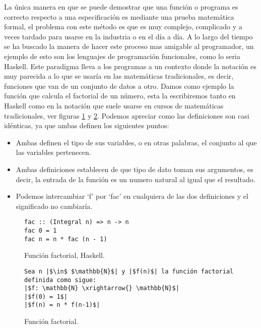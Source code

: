 La única manera en que se puede demostrar que una función o programa 
es correcto respecto a una especificación es mediante una prueba 
matemática formal, el problema con este método es que es muy complejo, 
complicado y a veces tardado para usarse en la industria o en el día a día. A lo largo del tiempo 
se ha buscado la manera de hacer este proceso mas amigable al programador, un ejemplo de esto son 
los lenguajes de programación funcionales, como lo seria Haskell. Este paradigma lleva a los 
programas a un contexto donde la notaci\'on es muy parecida a lo que se usar\'ia en las
matemáticas tradicionales, es decir, funciones que van de un conjunto de datos a otro. Damos como 
ejemplo la funci\'on que calcula el factorial de un n\'umero, esta la escribiremos tanto en Haskell 
como en la notaci\'on que suele usarse en cursos de matemáticas tradicionales, ver figuras 
\ref{func_fact_hask} y \ref{func_fact_math}. 
Podemos apreciar como las definiciones son casi idénticas, ya que ambas definen los siguientes 
puntos:
\begin{itemize}
    \item Ambas definen el tipo de sus variables, o en otras palabras, el conjunto al que las 
    variables pertenecen.
    \item Ambas definiciones establecen de que tipo de dato toman sus argumentos, es decir, la 
    entrada de la funci\'on es un numero natural al igual que el resultado.
    \item Podemos intercambiar `f' por `fac' en cualquiera de las dos definiciones y el significado 
    no cambiaría.
\end{itemize}
\begin{figure}[!ht]
\centering
\captionsetup{justification=centering}
\begin{verbatim}
fac :: (Integral n) => n -> n
fac 0 = 1
fac n = n * fac (n - 1)
\end{verbatim}
\caption{Funci\'on factorial, Haskell.}
\label{func_fact_hask}
\end{figure}

\begin{figure}[!ht]
\centering
\captionsetup{justification=centering}
\begin{verbatim}
Sea n |$\in$ $\mathbb{N}$| y |$f(n)$| la función factorial definida como sigue:
|$f: \mathbb{N} \xrightarrow{} \mathbb{N}$|
|$f(0) = 1$|
|$f(n) = n * f(n-1)$|
\end{verbatim}
\caption{Funci\'on factorial.}
\label{func_fact_math}
\end{figure}


